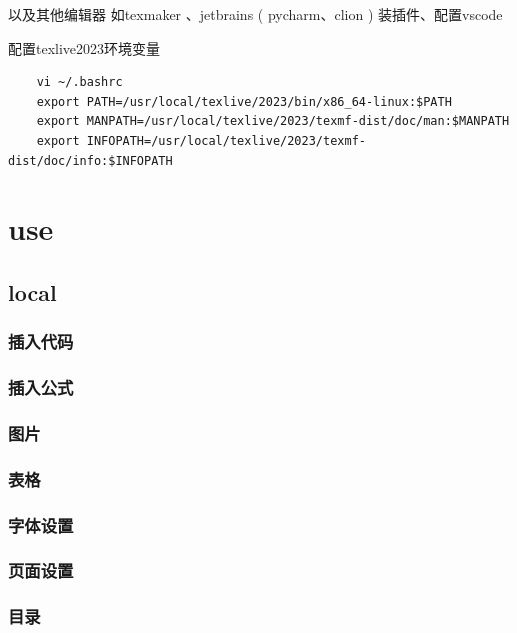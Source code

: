 \documentclass[11pt]{ctexart}
\begin{document}
以及其他编辑器 如texmaker 、jetbrains ( pycharm、clion ) 装插件、配置vscode


配置texlive2023环境变量

\begin{lstlisting}
	vi ~/.bashrc
	export PATH=/usr/local/texlive/2023/bin/x86_64-linux:$PATH
	export MANPATH=/usr/local/texlive/2023/texmf-dist/doc/man:$MANPATH
	export INFOPATH=/usr/local/texlive/2023/texmf-dist/doc/info:$INFOPATH
\end{lstlisting}




\newpage

\section{use}

\subsection{local}

\subsubsection{ 插入代码}

\subsubsection{插入公式}

\subsubsection{图片}


 
 \subsubsection{表格}
 
 \subsubsection{字体设置}
 
 \subsubsection{页面设置}
 
 \subsubsection{目录}
 
\end{document}
